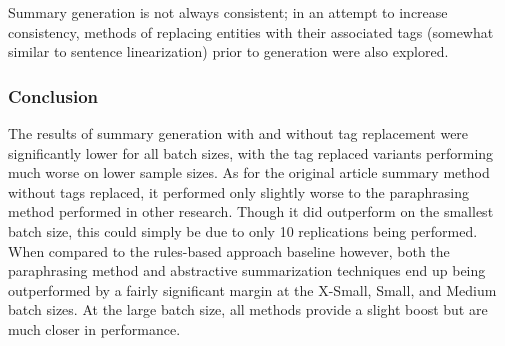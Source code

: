 \documentclass[12pt]{report}
\begin{document}
    Summary generation is not always consistent; in an attempt to increase consistency, methods of replacing entities with their associated tags (somewhat similar to sentence linearization) prior to generation were also explored.
    
    \subsubsection{Conclusion}
    The results of summary generation with and without tag replacement were significantly lower for all batch sizes, with the tag replaced variants performing much worse on lower sample sizes. As for the original article summary method without tags replaced, it performed only slightly worse to the paraphrasing method performed in other research. Though it did outperform on the smallest batch size, this could simply be due to only 10 replications being performed. When compared to the rules-based approach baseline however, both the paraphrasing method and abstractive summarization techniques end up being outperformed by a fairly significant margin at the X-Small, Small, and Medium batch sizes. At the large batch size, all methods provide a slight boost but are much closer in performance.





\clearpage
\addtocounter{chapter}{1}
\end{document}
